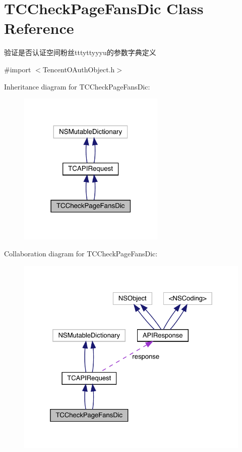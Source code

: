 \hypertarget{interface_t_c_check_page_fans_dic}{}\section{T\+C\+Check\+Page\+Fans\+Dic Class Reference}
\label{interface_t_c_check_page_fans_dic}


验证是否认证空间粉丝tttyttyyyu的参数字典定义  




{\ttfamily \#import $<$Tencent\+O\+Auth\+Object.\+h$>$}



Inheritance diagram for T\+C\+Check\+Page\+Fans\+Dic\+:\nopagebreak
\begin{figure}[H]
\begin{center}
\leavevmode
\includegraphics[width=198pt]{interface_t_c_check_page_fans_dic__inherit__graph}
\end{center}
\end{figure}


Collaboration diagram for T\+C\+Check\+Page\+Fans\+Dic\+:\nopagebreak
\begin{figure}[H]
\begin{center}
\leavevmode
\includegraphics[width=325pt]{interface_t_c_check_page_fans_dic__coll__graph}
\end{center}
\end{figure}
